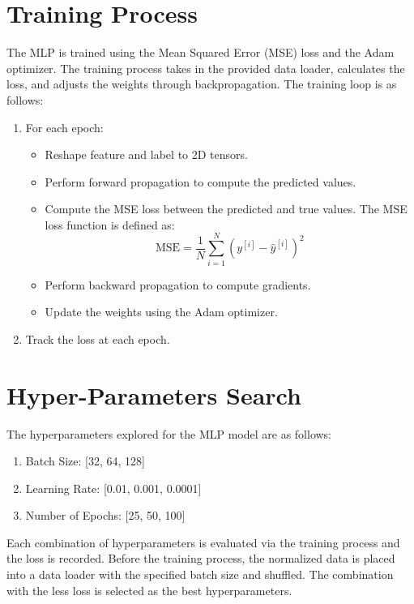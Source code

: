 \documentclass[12pt]{article}
\begin{document}
\section{Training Process}
The MLP is trained using the Mean Squared Error (MSE) loss and the Adam optimizer.
The training process takes in the provided data loader, calculates the loss, and adjusts the weights through backpropagation.
The training loop is as follows:

\begin{enumerate}
    \item For each epoch:
        \begin{itemize}
            \item Reshape feature and label to 2D tensors.
            \item Perform forward propagation to compute the predicted values.
            \item Compute the MSE loss between the predicted and true values. The MSE loss function is defined as:
                \begin{equation*}
                    \text{MSE} = \frac{1}{N} \sum_{i=1}^N (y^{[i]} - \hat{y}^{[i]})^2
                \end{equation*}
            \item Perform backward propagation to compute gradients.
            \item Update the weights using the Adam optimizer.
        \end{itemize}
    \item Track the loss at each epoch.
\end{enumerate}

\section{Hyper-Parameters Search}
The hyperparameters explored for the MLP model are as follows:
\begin{enumerate}
    \item Batch Size: [32, 64, 128]
    \item Learning Rate: [0.01, 0.001, 0.0001]
    \item Number of Epochs: [25, 50, 100]
\end{enumerate}


\noindent Each combination of hyperparameters is evaluated via the training process and the loss is recorded.
Before the training process, the normalized data is placed into a data loader with the specified batch size and shuffled.
The combination with the less loss is selected as the best hyperparameters.
\end{document}
